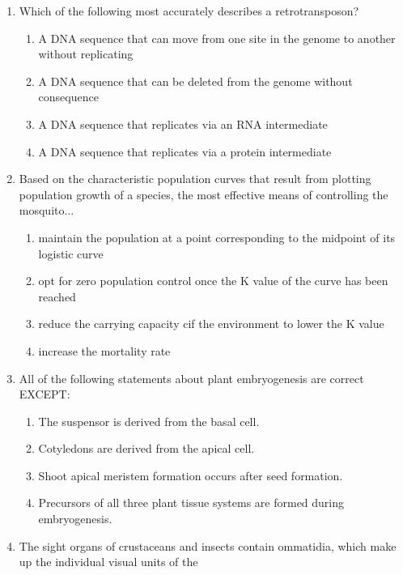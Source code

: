 \documentclass[12pt]{article}
\begin{document}
\begin{enumerate}[label=\arabic*.]
\begin{enumerate}[label=(\alph*)]
    \item Fermentation
    \item Decarboxylation
\end{enumerate}
\item Which of the following most accurately describes a retrotransposon?
\begin{enumerate}[label=(\alph*)]
    \item A DNA sequence that can move from one site in the genome to another without replicating
    \item A DNA sequence that can be deleted from the genome without consequence
    \item A DNA sequence that replicates via an RNA intermediate
    \item A DNA sequence that replicates via a protein intermediate
\end{enumerate}
\item Based on the characteristic population curves that result from plotting population growth of a species, the most effective means of controlling the mosquito...
\begin{enumerate}[label=(\alph*)]
    \item maintain the population at a point corresponding to the midpoint of its logistic curve
    \item opt for zero population control once the K value of the curve has been reached
    \item reduce the carrying capacity cif the environment to lower the K value
    \item increase the mortality rate
\end{enumerate}
\item All of the following statements about plant embryogenesis are correct EXCEPT:
\begin{enumerate}[label=(\alph*)]
    \item The suspensor is derived from the basal cell.
    \item Cotyledons are derived from the apical cell.
    \item Shoot apical meristem formation occurs after seed formation.
    \item Precursors of all three plant tissue systems are formed during embryogenesis.
\end{enumerate}
\item The sight organs of crustaceans and insects contain ommatidia, which make up the individual visual units of the
\begin{enumerate}[label=(\alph*)]

\end{enumerate}
\end{enumerate}
\end{document}
